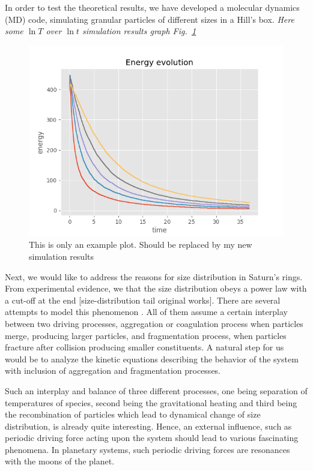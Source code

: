 \documentclass[11pt, notitlepage]{article} %
\begin{document}
In order to test the theoretical results, we have developed a molecular dynamics (MD) 
code, simulating granular particles of different sizes in a Hill's box. 
\emph{Here some $\ln T$ over $\ln t$ simulation results graph Fig.~\ref{fig2}}
\begin{figure}[h] %
	\centering
	\includegraphics[scale = .80]{Figures/energy_evo.png}
	\caption{\footnotesize This is only an example plot. Should be replaced by my new simulation results}
	\label{fig2}
\end{figure}

Next, we would like to address the reasons for size distribution in Saturn's rings. 
From experimental evidence, we that the size distribution obeys a power
law with a cut-off at the end [size-distribution tail original works]. There are several attempts
to model this phenomenon \cite{Brilliantov2013,Spahn2011}. All of them assume a certain interplay between
two driving processes, aggregation or coagulation process when particles merge, producing 
larger particles, and fragmentation process, when particles
fracture after collision producing smaller constituents. A natural step for us would be 
to analyze the kinetic equations describing the behavior of the system with inclusion 
of aggregation and fragmentation processes.

Such an interplay and balance of three different processes, one being separation of 
temperatures of species, second being the gravitational heating and third 
being the recombination of particles which lead to dynamical change of size distribution,
is already quite interesting. Hence, an external influence, such as periodic 
driving force acting upon the system should lead to various fascinating phenomena.
In planetary systems, such periodic driving forces are resonances with the moons of the 
planet.
\end{document}
